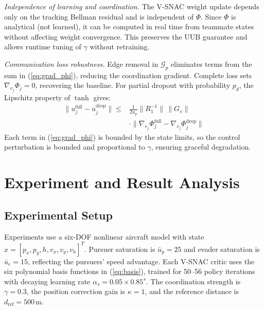 \documentclass[conference]{IEEEtran}
\begin{document}
\textit{Independence of learning and coordination.} The V-SNAC weight update depends only on the tracking Bellman residual and is independent of $\Phi$. Since $\Phi$ is analytical (not learned), it can be computed in real time from teammate states without affecting weight convergence. This preserves the UUB guarantee \cite{b_lewis1998} and allows runtime tuning of $\gamma$ without retraining.

\textit{Communication loss robustness.} Edge removal in $\mathcal{G}_p$ eliminates terms from the sum in (\ref{eq:grad_phi}), reducing the coordination gradient. Complete loss sets $\nabla_{v_j}\Phi_j = 0$, recovering the baseline. For partial dropout with probability $p_d$, the Lipschitz property of $\tanh$ gives:
\begin{equation}\label{eq:dropout}
\begin{split}
\|u_j^{\text{full}} - u_j^{\text{drop}}\| \leq {} & \frac{1}{2\bar{u}_p}\|R_1^{-1}\|\,\|G_v\| \\
& \cdot \|\nabla_{v_j}\Phi_j^{\text{full}} - \nabla_{v_j}\Phi_j^{\text{drop}}\|
\end{split}
\end{equation}
Each term in (\ref{eq:grad_phi}) is bounded by the state limits, so the control perturbation is bounded and proportional to $\gamma$, ensuring graceful degradation.


\section{Experiment and Result Analysis}

\subsection{Experimental Setup}

Experiments use a six-DOF nonlinear aircraft model with state $x = [p_x, p_y, h, v_x, v_y, v_h]^T$. Pursuer saturation is $\bar{u}_p = 25$ and evader saturation is $\bar{u}_e = 15$, reflecting the pursuers' speed advantage. Each V-SNAC critic uses the six polynomial basis functions in (\ref{eq:basis}), trained for 50--56 policy iterations with decaying learning rate $\alpha_s = 0.05 \times 0.85^s$. The coordination strength is $\gamma = 0.3$, the position correction gain is $\kappa = 1$, and the reference distance is $d_{\mathrm{ref}} = 500$\,m.
\end{document}
